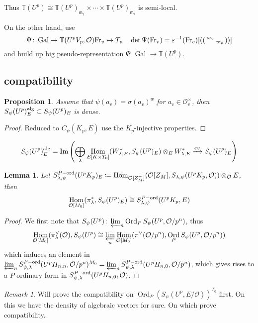\documentclass[leqno]{amsart}
\newcommand{\smat}[1]{\left( \begin{smallmatrix} #1 \end{smallmatrix} \right)}
\newcommand{\TT}{\mathbb{T}} %
\newcommand{\Fr}{\textnormal{Fr}} %
\DeclareMathOperator{\Gal}{Gal}
\DeclareMathOperator{\Ord}{Ord}
\newcommand{\alg}{\textnormal{alg}}
\newcommand{\ord}{\textnormal{ord}}
\newcommand{\oo}{\mathcal{O}} %
\newcommand{\fm}{\mathfrak{m}}
\DeclareMathOperator{\Hom}{Hom}
\DeclareMathOperator{\Image}{Im}
\newtheorem{lem}[thm]{Lemma}
\newtheorem{prop}[thm]{Proposition}
\theoremstyle{definition}
\theoremstyle{remark}
\newtheorem{rem}[thm]{Remark}
\begin{document}
Thus
$\TT(U^p)\cong\TT(U^p)_{\fm_1}\times\cdots
\times \TT(U^p)_{\fm_r}$
is semi-local.

On the other hand, use
\[
	\Psi\colon \Gal\to \TT(U^pV_p,\oo)
	\Fr_v\mapsto T_v\quad
	\det\Psi(\Fr_v)=\varepsilon^{-1}(\Fr_v)
	[(\smat{\varpi_v&\\&\varpi_v})]
\]
and build up big pseudo-representation
$\Psi\colon \Gal\to \TT(U^p)$.

\subsection{compatibility}

\begin{prop}
Assume that $\psi(a_v)=\sigma(a_v)^w$
for  $a_v\in \oo_v^\times$,
then $S_\psi(U^p)_E^{\alg}\subset S_\psi(U^p)_E$
is dense.
\end{prop}
\begin{proof}
	Reduced to $C_\psi(K_p,E)$ use the  $K_p$-injective properties.
\end{proof}
\[
S_\psi(U^p)_E^{\alg}=
\Image\left(
	\bigoplus_{\lambda}\Hom_{E[K\times T_0]}(W_{\lambda,E}^*, 
	S_\psi(U^p)_E)
	\otimes_EW_{\lambda,E}^*\xrightarrow{ev}
	S_\psi(U^p)_E
\right)
\]

\begin{lem}
	Let $S_{\lambda,\psi}^{P-\ord}(U^pK_p)_E
	\coloneqq \Hom_{\oo[Z_M^+]}
	(\oo[Z_M], S_{\lambda,\psi}(U^pK_p,\oo))\otimes_\oo E$,
	then
	\[
		\Hom_{\oo[M_0]}(\pi_\lambda^*, S_\psi(U^p)_E)\cong
		S_{\lambda,\psi}^{P-\ord}(U^pK_p,E)
	\]
\end{lem}
\begin{proof}
	We first note that 
	$S_\psi(U^p)\colon \varprojlim_{n}\Ord_PS_\psi(U^p, \oo/p^n)$,
	thus 
	\[
		\Hom_{\oo[M_0]}(\pi_\lambda^\vee(\oo),S_\psi(U^p)\cong
		\varprojlim_{n}\Hom_{\oo[M_0]}(\pi^\vee(\oo/p^n),
		\Ord_PS_\psi(U^p,\oo/p^n))
	\]
	which induces an element in 
	$\varprojlim_n S_{\psi,\lambda}^{P-\ord}(U^pH_{n,n},\oo/p^n)^{M_0}
	=\varprojlim_n S_{\psi,\lambda}^{P-\ord}(U^pH_{n,0},\oo/p^n)$,
	which gives rises to a $P$-ordinary form in 
	$S_{\psi,\lambda}^{P-\ord}(U^pH_{n,0},\oo)$.
\end{proof}


\begin{rem}
	Will prove the compatibility on 
	$\Ord_P(S_\psi(U^p,E/\oo))^{T_0}$ first.
	On this we have the density of 
	algebraic vectors for sure.
	On which prove compatibility. 
\end{rem}
\end{document}
